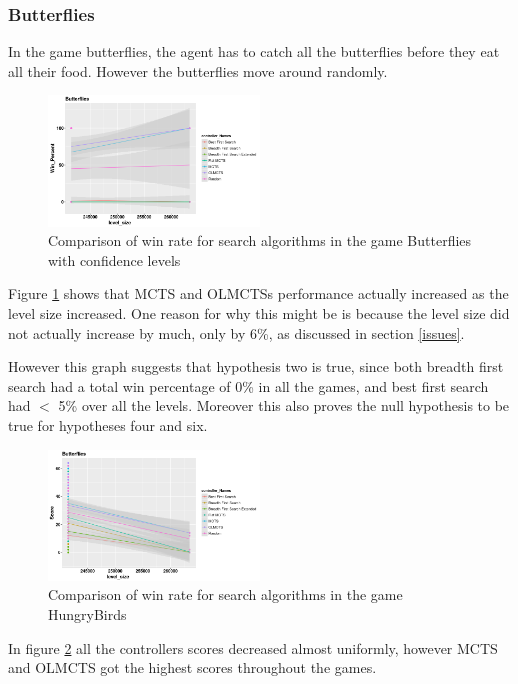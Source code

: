 \documentclass[journal]{IEEEtran}
\begin{document}
		\subsubsection{Butterflies}
		In the game butterflies, the agent has to catch all the butterflies before they eat all their food. However the butterflies move around randomly.

		\begin{figure}[h]
		    \centering
		    \includegraphics[width=0.5\textwidth]{Scatter/game_11_name_confidence}
		    \caption{ Comparison of win rate for search algorithms in the game Butterflies with confidence levels }
		    \label{fig:game_11_win}
		\end{figure}
		Figure \ref{fig:game_11_win} shows that MCTS and OLMCTSs performance actually increased as the level size increased. One reason for why this might be is because the level size did not actually increase by much, only by 6\%, as discussed in section \ref{issues}.

		However this graph suggests that hypothesis two is true, since both breadth first search had a total win percentage of 0\% in all the games, and best first search had $<$ 5\% over all the levels.
		Moreover this also proves the null hypothesis to be true for hypotheses four and six.

		\begin{figure}[h]
		    \centering
		    \includegraphics[width=0.5\textwidth]{Scatter/game_11_score_confidence}
		    \caption{ Comparison of win rate for search algorithms in the game HungryBirds }
		    \label{fig:game_11_score_confidence}
		\end{figure}
		In figure \ref{fig:game_11_score_confidence} all the controllers scores decreased almost uniformly, however MCTS and OLMCTS got the highest scores throughout the games.
		
\end{document}
